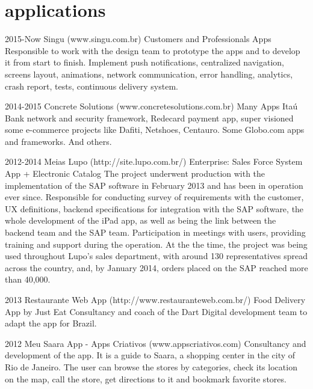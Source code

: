 \documentclass[]{friggeri-cv}
\begin{document}
\newpage

\section{applications}

\begin{entrylist}

      \entry
    {2015-Now}
    {Singu (www.singu.com.br)}
    {Customers and Professionals Apps}
    {Responsible to work with the design team to prototype the apps and to develop it from start to finish. Implement push notifications, centralized navigation, screens layout, animations, network communication, error handling, analytics, crash report, tests, continuous delivery system.}
    
    \entry
    {2014-2015}
    {Concrete Solutions (www.concretesolutions.com.br)}
    {Many Apps}
    {Itaú Bank network and security framework, Redecard payment app, super visioned some e-commerce projects like Dafiti, Netshoes, Centauro. Some Globo.com apps and frameworks. And others.}

      \entry
    {2012-2014}
    {Meias Lupo (http://site.lupo.com.br/)}
    {Enterprise: Sales Force System App + Electronic Catalog}
    {The project underwent production with the implementation of the SAP software in February 2013 and has been in operation ever since. Responsible for conducting survey of requirements with the customer, UX definitions, backend specifications for integration with the SAP software, the whole development of the iPad app, as well as being the link between the backend team and the SAP team. Participation in meetings with users, providing training and support during the operation. At the the time, the project was being used throughout Lupo's sales department, with around 130 representatives spread across the country, and, by January 2014, orders placed on the SAP reached more than 40,000.}

    \entry
    {2013}
    {Restaurante Web App (http://www.restauranteweb.com.br/)}
    {Food Delivery App by Just Eat}
    {Consultancy and coach of the Dart Digital development team to adapt the app for Brazil.}
    
    \entry
    {2012}
    {Meu Saara App - Apps Criativos (www.appscriativos.com)}
    {}
    {Consultancy and development of the app. It is a guide to Saara, a shopping center in the city of Rio de Janeiro. The user can browse the stores by categories, check its location on the map, call the store, get directions to it and bookmark favorite stores.}
    

\end{entrylist}
\end{document}
